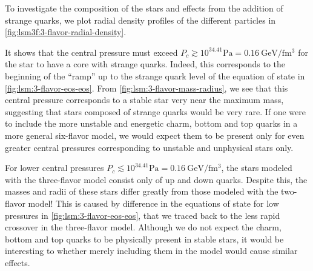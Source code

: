To investigate the composition of the stars and effects from the addition of strange quarks,
we plot radial density profiles of the different particles in \cref{fig:lsm3f:3-flavor-radial-density}.

It shows that the central pressure must exceed $P_c \gtrsim 10^{34.41} \si{\pascal} = \SI{0.16}{\giga\electronvolt\per\femto\meter\cubed}$ for the star to have a core with strange quarks.
Indeed, this corresponds to the beginning of the ``ramp'' up to the strange quark level of the equation of state in \cref{fig:lsm:3-flavor-eos-eos}.
From \cref{fig:lsm:3-flavor-mass-radius}, we see that this central pressure corresponds to a stable star very near the maximum mass, suggesting that stars composed of strange quarks would be very rare.
If one were to include the more unstable and energetic charm, bottom and top quarks in a more general six-flavor model, we would expect them to be present only for even greater central pressures corresponding to unstable and unphysical stars only. 

For lower central pressures $P_c \lesssim 10^{34.41} \si{\pascal} = \SI{0.16}{\giga\electronvolt\per\femto\meter\cubed}$, the stars modeled with the three-flavor model consist only of up and down quarks.
Despite this, the masses and radii of these stars differ greatly from those modeled with the two-flavor model!
This is caused by difference in the equations of state for low pressures in \cref{fig:lsm:3-flavor-eos-eos}, that we traced back to the less rapid crossover in the three-flavor model.
Although we do not expect the charm, bottom and top quarks to be physically present in stable stars, it would be interesting to whether merely including them in the model would cause similar effects.

